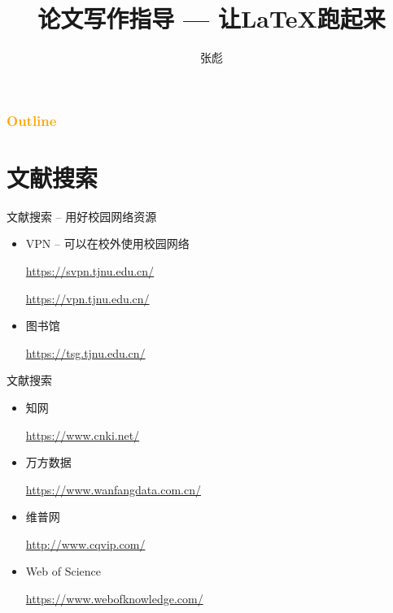 \documentclass[13pt]{ctexbeamer}
\begin{document}
\title[让LaTeX跑起来]{论文写作指导  ---  让LaTeX跑起来}
\author[]{{\large 张彪} }

\date{}


%



\begin{frame}
\maketitle
\end{frame}


\begin{frame}
	\frametitle{\textcolor{orange}{Outline}}
	\tableofcontents
\end{frame}




\section{文献搜索}
\begin{frame}{文献搜索 -- 用好校园网络资源}
    \begin{itemize}
        \item VPN  -- 可以在校外使用校园网络

        \href{https://svpn.tjnu.edu.cn/}{https://svpn.tjnu.edu.cn/}

        \href{https://vpn.tjnu.edu.cn/}{https://vpn.tjnu.edu.cn/}




        \item 图书馆

        \href{https://tsg.tjnu.edu.cn/}{https://tsg.tjnu.edu.cn/}
    \end{itemize}
\end{frame}


\begin{frame}{文献搜索}
    \begin{itemize}

        \item 知网

        \href{https://www.cnki.net/}{https://www.cnki.net/}

        \item 万方数据

        \href{https://www.wanfangdata.com.cn/}{https://www.wanfangdata.com.cn/}


        \item 维普网

        \href{http://www.cqvip.com/}{http://www.cqvip.com/}

        \item Web of Science

        \href{https://www.webofknowledge.com/}{https://www.webofknowledge.com/}
    \end{itemize}

\end{frame}
\end{document}
